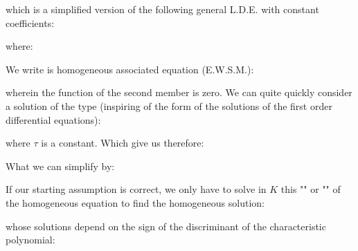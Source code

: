 	which is a simplified version of the following general L.D.E. with constant coefficients:
	
	where:
	
	We write is homogeneous associated equation (E.W.S.M.):
	
	wherein the function of the second member is zero. We can quite quickly consider a solution of the type (inspiring of the form of the solutions of the first order differential equations):
	
	where $\tau$ is a constant. Which give us therefore:
	
	What we can simplify by:
	
	If our starting assumption is correct, we only have to solve in $K$ this "\label{characteristic equation}"  or "" of the homogeneous equation to find the homogeneous solution:
	
	whose solutions depend on the sign of the discriminant of the characteristic polynomial\label{discriminant differential equation}:
	
